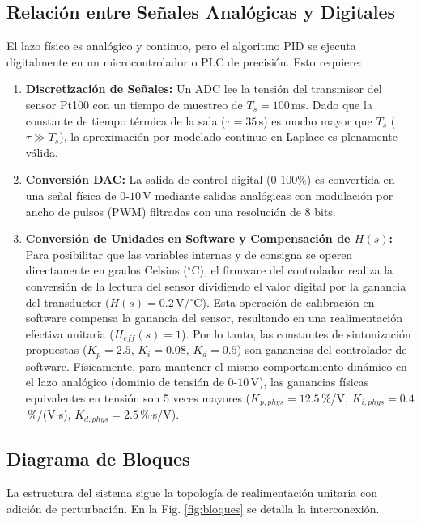 \documentclass[journal,twocolumn]{IEEEtran}
\begin{document}
\subsection{Relación entre Señales Analógicas y Digitales}
El lazo físico es analógico y continuo, pero el algoritmo PID se ejecuta digitalmente en un microcontrolador o PLC de precisión. Esto requiere:
\begin{enumerate}
    \item \textbf{Discretización de Señales:} Un ADC lee la tensión del transmisor del sensor Pt100 con un tiempo de muestreo de $T_s = 100$\,ms. Dado que la constante de tiempo térmica de la sala ($\tau = 35$\,s) es mucho mayor que $T_s$ ($\tau \gg T_s$), la aproximación por modelado continuo en Laplace es plenamente válida.
    \item \textbf{Conversión DAC:} La salida de control digital (0-100\%) es convertida en una señal física de $0$-$10$\,V mediante salidas analógicas con modulación por ancho de pulsos (PWM) filtradas con una resolución de 8 bits.
    \item \textbf{Conversión de Unidades en Software y Compensación de $H(s)$:} Para posibilitar que las variables internas y de consigna se operen directamente en grados Celsius ($^\circ$C), el firmware del controlador realiza la conversión de la lectura del sensor dividiendo el valor digital por la ganancia del transductor ($H(s) = 0.2$\,V/$^\circ$C). Esta operación de calibración en software compensa la ganancia del sensor, resultando en una realimentación efectiva unitaria ($H_{eff}(s) = 1$). Por lo tanto, las constantes de sintonización propuestas ($K_p = 2.5$, $K_i = 0.08$, $K_d = 0.5$) son ganancias del controlador de software. Físicamente, para mantener el mismo comportamiento dinámico en el lazo analógico (dominio de tensión de $0$-$10$\,V), las ganancias físicas equivalentes en tensión son 5 veces mayores ($K_{p,phys} = 12.5$\,\%/V, $K_{i,phys} = 0.4$\,\%/(V$\cdot$s), $K_{d,phys} = 2.5$\,\%$\cdot$s/V).
\end{enumerate}

\subsection{Diagrama de Bloques}
La estructura del sistema sigue la topología de realimentación unitaria con adición de perturbación. En la Fig. \ref{fig:bloques} se detalla la interconexión.
\end{document}
